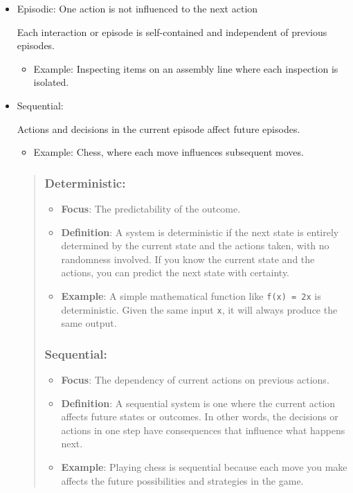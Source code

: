 \documentclass[
]{article}
\begin{document}
\begin{itemize}
\item
  Episodic: One action is not influenced to the next action

  Each interaction or episode is self-contained and independent of
  previous episodes.

  \begin{itemize}
  \item
    Example: Inspecting items on an assembly line where each inspection
    is isolated.
  \end{itemize}
\item
  Sequential:

  Actions and decisions in the current episode affect future episodes.

  \begin{itemize}
  \item
    Example: Chess, where each move influences subsequent moves.
  \end{itemize}

  \begin{quote}
  \subsubsection{\texorpdfstring{\textbf{Deterministic}:}{Deterministic:}}\label{deterministic-2}

  \begin{itemize}
  \item
    \textbf{Focus}: The predictability of the outcome.
  \item
    \textbf{Definition}: A system is deterministic if the next state is
    entirely determined by the current state and the actions taken, with
    no randomness involved. If you know the current state and the
    actions, you can predict the next state with certainty.
  \item
    \textbf{Example}: A simple mathematical function like
    \texttt{f(x)\ =\ 2x} is deterministic. Given the same input
    \texttt{x}, it will always produce the same output.
  \end{itemize}

  \subsubsection{\texorpdfstring{\textbf{Sequential}:}{Sequential:}}\label{sequential}

  \begin{itemize}
  \item
    \textbf{Focus}: The dependency of current actions on previous
    actions.
  \item
    \textbf{Definition}: A sequential system is one where the current
    action affects future states or outcomes. In other words, the
    decisions or actions in one step have consequences that influence
    what happens next.
  \item
    \textbf{Example}: Playing chess is sequential because each move you
    make affects the future possibilities and strategies in the game.
  \end{itemize}


\end{quote}
\end{itemize}
\end{document}
